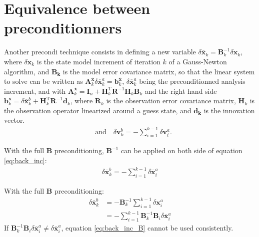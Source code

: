 \documentclass[npg, manuscript]{copernicus}
\begin{document}






\appendix
\section{Equivalence between preconditionners}
Another precondi technique consists in defining a new variable $\delta \overline{\mathbf{x}}_k = \mathbf{B}_k^{-1} \delta \mathbf{x}_k$, where $\delta \mathbf{x}_k$ is the state model increment of iteration $k$ of a Gauss-Newton algorithm, and $\mathbf{B_k}$ is the model error covariance matrix, so that the linear system to solve can be written as $\mathbf{A}^{\overline{\mathbf{x}}}_k \delta \overline{\mathbf{x}}^a_k = \mathbf{b}^{\overline{\mathbf{x}}}_k$, $\delta \overline{\mathbf{x}}^a_k$ being the preconditionned analysis increment, and with $\mathbf{A}^{\overline{\mathbf{x}}}_k = \mathbf{I}_n + \mathbf{H}_k^\mathrm{T} \mathbf{R}^{-1} \mathbf{H}_k \mathbf{B}_k$ and the right hand side $\mathbf{b}^{\overline{\mathbf{x}}}_k =  \delta \overline{\mathbf{x}}^b_k + \mathbf{H}_k^\mathrm{T} \mathbf{R}^{-1} \mathbf{d}_k$, where $\mathbf{R}_k$ is the observation error covariance matrix, $\mathbf{H}_k$ is the observation operator linearized around a guess state, and $\mathbf{d_k}$ is the innovation vector. 
\begin{align}
 \quad \textrm{and} \quad \delta \mathbf{v}^b_k = - \sum_{i=1}^{k-1} \delta \mathbf{v}^a_i .
\label{eq:inc_recur}
\end{align}


With the full $\mathbf{B}$ preconditioning, $\mathbf{B}^{-1}$ can be applied on both side of equation \eqref{eq:back_inc}:
\begin{align}
\label{eq:back_inc_B}
\boxed{\delta \overline{\mathbf{x}}^b_k = - \sum_{i=1}^{k-1} \delta \overline{\mathbf{x}}^a_i}
\end{align}

With the full $\mathbf{B}$ preconditioning:
\begin{align}
\label{eq:back_inc_B_diff}
\delta \overline{\mathbf{x}}^b_k & = - \mathbf{B}_k^{-1}\sum_{i=1}^{k-1} \delta \mathbf{x}^a_i \nonumber \\
& = - \sum_{i=1}^{k-1} \mathbf{B}_k^{-1} \mathbf{B}_i \delta \overline{\mathbf{x}}^a_i
\end{align}
If $\mathbf{B}_k^{-1} \mathbf{B}_i \delta \overline{\mathbf{x}}^a_i \ne \delta \overline{\mathbf{x}}^a_i$, equation \eqref{eq:back_inc_B} cannot be used consistently.
\end{document}
